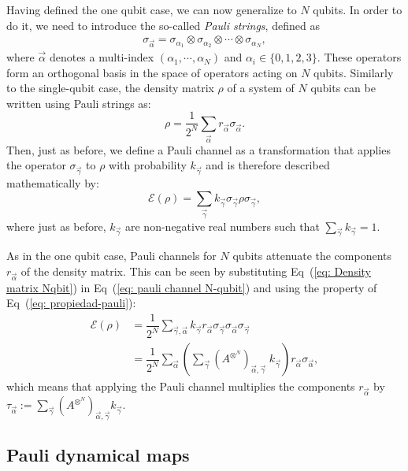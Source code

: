 \documentclass[10pt,letterpaper]{article} %
\newcommand{\eref}[1]{Eq~(\ref{#1})}
\begin{document}
Having defined the one qubit case,  we can now generalize to $N$ qubits.
In order to do it, we need to introduce the so-called \textit{Pauli strings}, defined as
\begin{eqnarray}
\label{eq: Pauli string}
\sigma_{\vec{\alpha}} = \sigma_{\alpha_1} \otimes \sigma_{\alpha_2}\otimes \cdots \otimes \sigma_{\alpha_N},
\end{eqnarray}
where $\vec{\alpha}$ denotes a multi-index $(\alpha_1, \cdots, \alpha_N)$
 and $\alpha_i \in \{0,1,2,3\}$. 
These operators form an orthogonal basis in the space of operators acting on $N$ qubits. 
 Similarly to the single-qubit case, the density matrix $\rho$ 
of a system of $N$ qubits can be written using Pauli strings as:
\begin{equation}
\label{eq:  Density matrix Nqbit}
\rho = \dfrac{1}{2^N} \sum_{\vec{\alpha}} r_{\vec{\alpha}} \sigma_{\vec{\alpha}}.
\end{equation}
Then, just as before, we define a Pauli channel as a transformation that applies 
the operator $\sigma_{\vec{\gamma}}$ to $\rho$ with probability $k_{\vec{\gamma}}$
and is therefore described mathematically by:
\begin{equation}
\label{eq: pauli channel N-qubit}
\mathcal{E}(\rho) = \sum_{\vec{\gamma}} k_{\vec{\gamma}} \sigma_{\vec{\gamma}} \rho \sigma_{\vec{\gamma}},
\end{equation}
where just as before, $k_{\vec{\gamma}}$ are non-negative real numbers such 
that $\sum_{\vec{\gamma}} k_{\vec{\gamma}}=1$.

As in the one qubit case, Pauli channels for $N$ qubits 
attenuate the components $r_{\vec{\alpha}}$ of the density matrix.
This can be seen by substituting \eref{eq:  Density matrix Nqbit} in \eref{eq: pauli channel N-qubit}
and using the property of \eref{eq: propiedad-pauli}:
\begin{align*}
\mathcal{E}(\rho) &= \dfrac{1}{2^N} \sum_{\vec{\gamma},\vec{\alpha}} k_{\vec{\gamma}} r_{\vec{\alpha}} \sigma_{\vec{\gamma}} \sigma_{\vec{\alpha}} \sigma_{\vec{\gamma}} \\
& = \dfrac{1}{2^N} \sum_{\vec{\alpha}} \left( \sum_{\vec{\gamma}} {(A^{\otimes^N})}_{\vec{\alpha},\vec{\gamma}} \; k_{\vec{\gamma}} \right) r_{\vec{\alpha}} \sigma_{\vec{\alpha}},
\end{align*}
which means that applying the Pauli channel multiplies the 
components $r_{\vec{\alpha}}$ by $\tau_{\vec{\alpha}} := \sum_{\vec{\gamma}} {(A^{\otimes^N})}_{\vec{\alpha},\vec{\gamma}} k_{\vec{\gamma}}$.
\subsection{Pauli dynamical maps} %
\label{subsec: Pauli Dynamical Maps}
\end{document}
